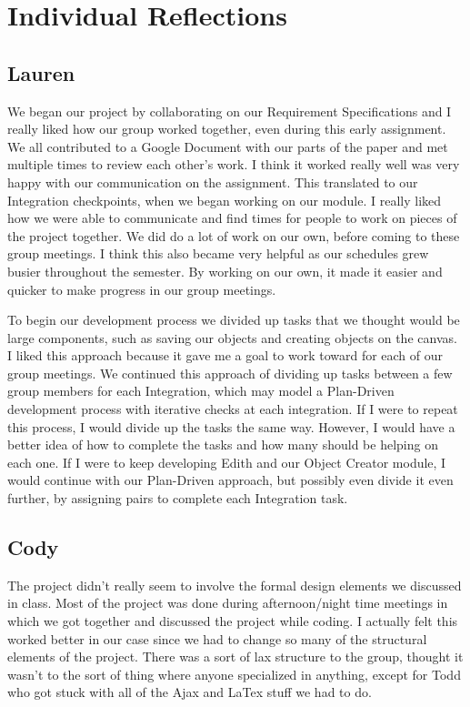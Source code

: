 \documentclass[a4paper, 11pt]{article} %
\begin{document}

\section*{Individual Reflections}

\subsection{Lauren}
We began our project by collaborating on our Requirement Specifications and I really liked how our group worked together, even during this early assignment. We all contributed to a Google Document with our parts of the paper and met multiple times to review each other’s work. I think it worked really well was very happy with our communication on the assignment. This translated to our Integration checkpoints, when we began working on our module. I really liked how we were able to communicate and find times for people to work on pieces of the project together. We did do a lot of work on our own, before coming to these group meetings. I think this also became very helpful as our schedules grew busier throughout the semester. By working on our own, it made it easier and quicker to make progress in our group meetings.

To begin our development process we divided up tasks that we thought would be large components, such as saving our objects and creating objects on the canvas. I liked this approach because it gave me a goal to work toward for each of our group meetings. We continued this approach of dividing up tasks between a few group members for each Integration, which may model a Plan-Driven development process with iterative checks at each integration.  If I were to repeat this process, I would divide up the tasks the same way. However, I would have a better idea of how to complete the tasks and how many should be helping on each one. If I were to keep developing Edith and our Object Creator module, I would continue with our Plan-Driven approach, but possibly even divide it even further, by assigning pairs to complete each Integration task.

\subsection{Cody}
The project didn’t really seem to involve the formal design elements we discussed in class. Most of the project was done during afternoon/night time meetings in which we got together and discussed the project while coding. I actually felt this worked better in our case since we had to change so many of the structural elements of the project. There was a sort of lax structure to the group, thought it wasn’t to the sort of thing where anyone specialized in anything, except for Todd who got stuck with all of the Ajax and LaTex stuff we had to do.
\end{document}
